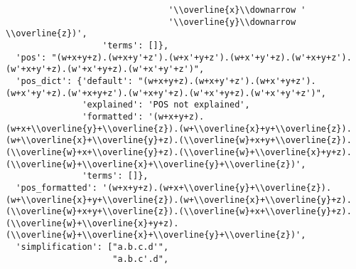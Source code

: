 \begin{verbatim}
                                '\\overline{x}\\downarrow '
                                '\\overline{y}\\downarrow \\overline{z})',
                   'terms': []},
  'pos': "(w+x+y+z).(w+x+y'+z').(w+x'+y+z').(w+x'+y'+z).(w'+x+y+z').(w'+x+y'+z).(w'+x'+y+z).(w'+x'+y'+z')",
  'pos_dict': {'default': "(w+x+y+z).(w+x+y'+z').(w+x'+y+z').(w+x'+y'+z).(w'+x+y+z').(w'+x+y'+z).(w'+x'+y+z).(w'+x'+y'+z')",
               'explained': 'POS not explained',
               'formatted': '(w+x+y+z).(w+x+\\overline{y}+\\overline{z}).(w+\\overline{x}+y+\\overline{z}).(w+\\overline{x}+\\overline{y}+z).(\\overline{w}+x+y+\\overline{z}).(\\overline{w}+x+\\overline{y}+z).(\\overline{w}+\\overline{x}+y+z).(\\overline{w}+\\overline{x}+\\overline{y}+\\overline{z})',
               'terms': []},
  'pos_formatted': '(w+x+y+z).(w+x+\\overline{y}+\\overline{z}).(w+\\overline{x}+y+\\overline{z}).(w+\\overline{x}+\\overline{y}+z).(\\overline{w}+x+y+\\overline{z}).(\\overline{w}+x+\\overline{y}+z).(\\overline{w}+\\overline{x}+y+z).(\\overline{w}+\\overline{x}+\\overline{y}+\\overline{z})',
  'simplification': ["a.b.c.d'",
                     "a.b.c'.d",

\end{verbatim}
